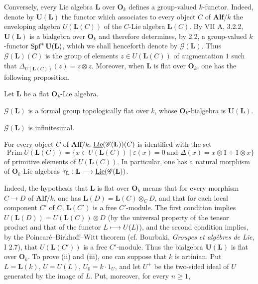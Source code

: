Conversely, every Lie algebra $\mathbf L$ over $\mathbf O_k$ defines a group-valued $k$-functor. Indeed, denote by $\mathbf U(\mathbf L)$ the functor which associates to every object $C$ of $\mathbf{Alf}/k$ the enveloping algebra $U(\mathbf L(C))$ of the $C$-Lie algebra $\mathbf L(C)$. By VII A, 3.2.2, $\mathbf U(\mathbf L)$ is a bialgebra over $\mathbf O_k$ and therefore determines, by 2.2, a group-valued $k$-functor $\operatorname{Spf}^*\mathbf U(\mathbf L)$, which we shall henceforth denote by $\mathscr G(\mathbf L)$. Thus $\mathscr G(\mathbf L)(C)$ is the group of elements $z\in U(\mathbf L(C))$ of augmentation $1$ such that $\Delta_{U(\mathbf L(C))}(z)=z\otimes z$.
Moreover, when $\mathbf L$ is flat over $\mathbf O_k$, one has the following proposition.
\begin{proposition}{}
Let $\mathbf L$ be a flat $\mathbf O_k$-Lie algebra.
\begin{enumeratei}
\item $\mathscr G(\mathbf L)$ is a formal group topologically flat over $k$, whose $\mathbf O_k$-bialgebra is $\mathbf U(\mathbf L)$.
\item $\mathscr G(\mathbf L)$ is infinitesimal.
\item For every object $C$ of $\mathbf{Alf}/k$, $\underline{\operatorname{Lie}}(\mathscr G(\mathbf L))(C)$ is identified with the set
\[
\operatorname{Prim}U(\mathbf L(C))=\{x\in U(\mathbf L(C))\mid\varepsilon(x)=0\ \text{and }\Delta(x)=x\otimes1+1\otimes x\}
\]
of primitive elements of $U(\mathbf L(C))$. In particular, one has a natural morphism of $\mathbf O_k$-Lie algebras $\tau_{\mathbf L}:\mathbf L\longrightarrow\underline{\operatorname{Lie}}(\mathscr G(\mathbf L))$.
\end{enumeratei}
\end{proposition}
Indeed, the hypothesis that $\mathbf L$ is flat over $\mathbf O_k$ means that for every morphism $C\to D$ of $\mathbf{Alf}/k$, one has $\mathbf L(D)=\mathbf L(C)\otimes_C D$, and that for each local component $C'$ of $C$, $\mathbf L(C')$ is a free $C'$-module. The first condition implies $U(\mathbf L(D))=U(\mathbf L(C))\otimes D$ (by the universal property of the tensor product and that of the functor $L\longmapsto U(L)$), and the second condition implies, by the Poincaré--Birkhoff--Witt theorem (cf. Bourbaki, \textit{Groupes et algèbres de Lie}, I 2.7), that $U(\mathbf L(C'))$ is a free $C'$-module. Thus the bialgebra $\mathbf U(\mathbf L)$ is flat over $\mathbf O_k$.
To prove (ii) and (iii), one can suppose that $k$ is artinian. Put $L=\mathbf L(k)$, $U=U(L)$, $U_0=k\cdot1_U$, and let $U^+$ be the two-sided ideal of $U$ generated by the image of $L$. Put, moreover, for every $n\geq1$,
